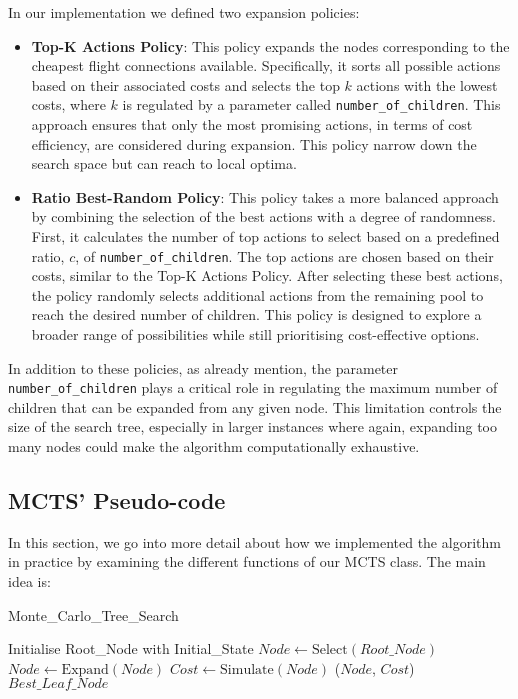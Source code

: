 In our implementation we defined two expansion policies:

\begin{itemize}
    \item \textbf{Top-K Actions Policy}: This policy expands the nodes corresponding to the cheapest flight connections available. Specifically, it sorts all possible actions based on their associated costs and selects the top \(k\) actions with the lowest costs, where \(k\) is regulated by a parameter called \texttt{number\_of\_children}. This approach ensures that only the most promising actions, in terms of cost efficiency, are considered during expansion. This policy narrow down the search space but can reach to local optima.
    \item \textbf{Ratio Best-Random Policy}: This policy takes a more balanced approach by combining the selection of the best actions with a degree of randomness. First, it calculates the number of top actions to select based on a predefined ratio, \(c\), of \texttt{number\_of\_children}. The top actions are chosen based on their costs, similar to the Top-K Actions Policy. After selecting these best actions, the policy randomly selects additional actions from the remaining pool to reach the desired number of children. This policy is designed to explore a broader range of possibilities while still prioritising cost-effective options.
\end{itemize}

In addition to these policies, as already mention, the parameter \texttt{number\_of\_children} plays a critical role in regulating the maximum number of children that can be expanded from any given node. This limitation controls the size of the search tree, especially in larger instances where again, expanding too many nodes could make the algorithm computationally exhaustive.

\subsection{MCTS' Pseudo-code}
In this section, we go into more detail about how we implemented the algorithm in practice by examining the different functions of our MCTS class. The main idea is:

\begin{algorithm}[H]
    \caption{Monte\_Carlo\_Tree\_Search}
    \label{alg:MCTS}
    \begin{algorithmic}[1]
        \STATE Initialise Root\_Node with Initial\_State
        \STATE $Node \leftarrow \text{Select}(Root\_Node)$
        \STATE $Node \leftarrow \text{Expand}(Node)$
        \ENDIF
        \STATE $Cost \leftarrow \text{Simulate}(Node)$
        \STATE {}($Node$, $Cost$)
        \ENDWHILE
        \RETURN $Best\_Leaf\_Node$
    \end{algorithmic}
\end{algorithm}

